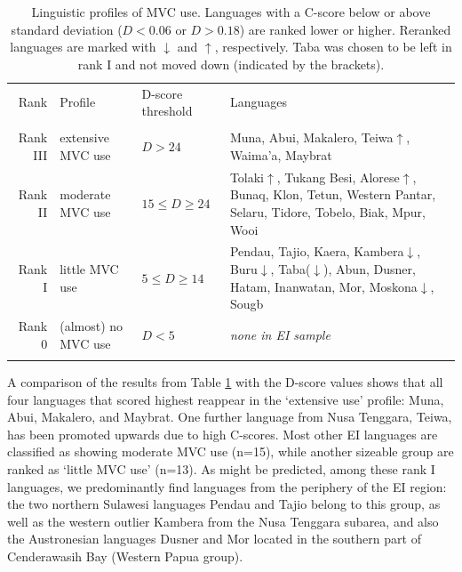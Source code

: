 \begin{table}
\begin{footnotesize}
\begin{tabular}{r l l p{5cm} }
\lsptoprule
Rank & Profile & D-score threshold & Languages \\
 \\ 
\hline
 Rank III & extensive MVC use & $D > 24 $ & Muna, Abui, Makalero, Teiwa$\uparrow$, Waima'a, Maybrat \\ 
\hline 
Rank II & moderate MVC use & $  15 \leq D \geq 24 $ & Tolaki$\uparrow$, Tukang Besi, Alorese$\uparrow$, Bunaq, Klon, Tetun, Western Pantar, Selaru, Tidore, Tobelo, Biak, Mpur, Wooi \\
\hline
Rank I & little MVC use & $ 5 \leq D \geq 14 $  & Pendau, Tajio, Kaera, Kambera$\downarrow$, Buru$\downarrow$, Taba($\downarrow$), Abun, Dusner, Hatam, Inanwatan, Mor, Moskona$\downarrow$, Sougb \\
\hline 
Rank 0 & (almost) no MVC use & $ D < 5 $ & \textit{none in EI sample} \\    
\lspbottomrule 
\end{tabular}
\end{footnotesize}
\caption[Linguistic profiles of MVC use]{Linguistic profiles of MVC use. Languages with a C-score below or above standard deviation ($D < 0.06$ or $D > 0.18$) are ranked lower or higher. Reranked languages are marked with $\downarrow$ and $\uparrow$, respectively. Taba was chosen to be left in rank I and not moved down (indicated by the brackets).}
\label{table:profile_MVCuse} 
\end{table}

A comparison of the results from Table \ref{table:profile_MVCuse} with the D-score values shows that all four languages that scored highest reappear in the `extensive use' profile: Muna, Abui, Makalero, and Maybrat. One further language from Nusa Tenggara, Teiwa, has been promoted upwards due to high C-scores. Most other EI languages are classified as showing moderate MVC use (n=15), while another sizeable group are ranked as `little MVC use' (n=13). As might be predicted, among these rank I languages, we predominantly find languages from the periphery of the EI region: the two northern Sulawesi languages Pendau and Tajio belong to this group, as well as the western outlier Kambera from the Nusa Tenggara subarea, and also the Austronesian languages Dusner and Mor located in the southern part of Cenderawasih Bay (Western Papua group). 

